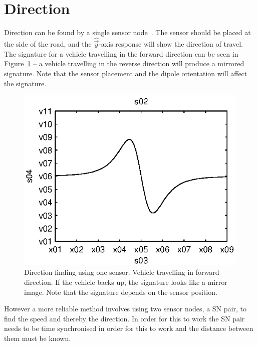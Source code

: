 \section{Direction}
Direction can be found by a single sensor node~\cite{an218}. The sensor should be placed at the side of the road, and the $\hat{\vec{y}}$-axis response will show the direction of travel. The signature for a vehicle travelling in the forward direction can be seen in Figure~\ref{fig:direction} -- a vehicle travelling in the reverse direction will produce a mirrored signature. Note that the sensor placement and the dipole orientation will affect the signature.

\begin{figure}[bht]
 \centering
 \begin{minipage}{0.6\linewidth}
 \centering
 
 \includegraphics[width=1\linewidth]{images/direction}
 \caption[Direction finding using one sensor]{Direction finding using one sensor. Vehicle travelling in forward direction. If the vehicle backs up, the signature looks like a mirror image. Note that the signature depends on the sensor position.}
 \label{fig:direction}
 \end{minipage}
\end{figure}

However a more reliable method involves using two sensor nodes, a SN pair, to find the speed and thereby the direction. In order for this to work the SN pair needs to be time synchronised in order for this to work and the distance between them must be known.

